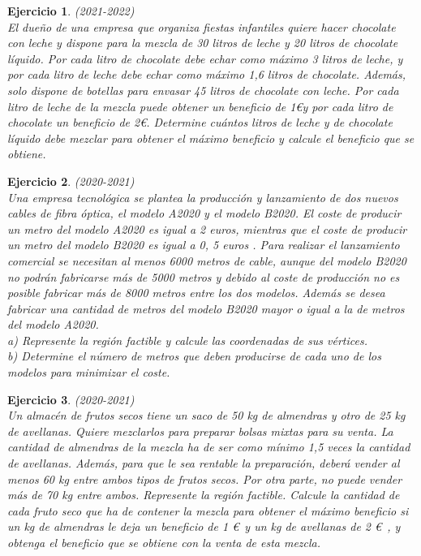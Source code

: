 \documentclass[12pt, a4paper]{amsart}
\newtheorem{ejer}{Ejercicio}
\begin{document}
\begin{ejer}\em (2021-2022)\\
El dueño de una empresa que organiza fiestas infantiles quiere hacer chocolate con leche y dispone para la mezcla de 30 litros de leche y 20 litros de chocolate líquido. Por cada litro de chocolate
debe echar como máximo 3 litros de leche, y por cada litro de leche debe echar como máximo 1,6 litros de chocolate. Además, solo dispone de botellas para envasar 45 litros de chocolate con leche. Por cada litro de leche de la mezcla puede obtener un beneficio de 1\euro y por cada litro de chocolate un beneficio de 2\euro. Determine cuántos litros de leche y de chocolate líquido debe mezclar para obtener el máximo beneficio y calcule el beneficio que se obtiene.
\end{ejer}

\begin{ejer}\em (2020-2021)\\
Una empresa tecnológica se plantea la producción y lanzamiento de dos nuevos cables de fibra óptica, el modelo A2020 y el modelo B2020. El coste de producir un metro del modelo A2020 es igual a 2 euros, mientras que el
coste de producir un metro del modelo B2020 es igual a 0, 5 euros . Para realizar el lanzamiento comercial se necesitan al menos 6000 metros de cable, aunque del modelo B2020 no podrán fabricarse más de 5000 metros y debido al coste de producción no es posible fabricar más de 8000 metros entre los dos modelos. Además se desea fabricar una cantidad de metros del modelo B2020 mayor o igual a la de metros del modelo A2020.\\
a) Represente la región factible y calcule las coordenadas de sus vértices.\\
b) Determine el número de metros que deben producirse de cada uno de los modelos para minimizar el coste.
\end{ejer}

\newpage

\begin{ejer}\em (2020-2021)\\
Un almacén de frutos secos tiene un saco de 50 kg de almendras y otro de 25 kg de avellanas. Quiere mezclarlos para preparar bolsas mixtas para su venta. La cantidad de almendras de la mezcla ha de ser como mínimo 1,5 veces la cantidad de avellanas. Además, para que le sea rentable la preparación, deberá vender al menos 60 kg entre ambos tipos de frutos secos. Por otra parte, no puede vender más de 70 kg entre ambos. Represente la región factible. Calcule la cantidad de cada fruto seco que ha de contener la mezcla para obtener el máximo beneficio si un kg de almendras le deja un beneficio de 1 \euro\ y un kg de avellanas de 2 \euro\ , y obtenga el beneficio que se obtiene con la venta de esta mezcla.
\end{ejer}
\end{document}
